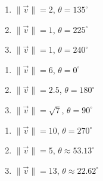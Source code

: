 \begin{multicols}{3}

\begin{enumerate}

\setcounter{enumi}{\value{HW}}

\item $\|\vec{v}\| = 2$, $\theta = 135^{\circ}$
\item $\|\vec{v}\| = 1$, $\theta = 225^{\circ}$
\item $\|\vec{v}\| = 1$, $\theta = 240^{\circ}$

\setcounter{HW}{\value{enumi}}

\end{enumerate}

\end{multicols}

\begin{multicols}{3}

\begin{enumerate}

\setcounter{enumi}{\value{HW}}

\item  $\|\vec{v}\| = 6$, $\theta = 0^{\circ}$
\item $\|\vec{v}\| = 2.5$, $\theta = 180^{\circ}$
\item  $\|\vec{v}\| = \sqrt{7}$, $\theta = 90^{\circ}$

\setcounter{HW}{\value{enumi}}

\end{enumerate}

\end{multicols}

\begin{multicols}{3}

\begin{enumerate}

\setcounter{enumi}{\value{HW}}

\item  $\|\vec{v}\| = 10$, $\theta = 270^{\circ}$
\item $\|\vec{v}\| = 5$, $\theta \approx 53.13^{\circ}$
\item $\|\vec{v}\| = 13$, $\theta \approx 22.62^{\circ}$

\setcounter{HW}{\value{enumi}}

\end{enumerate}

\end{multicols}


